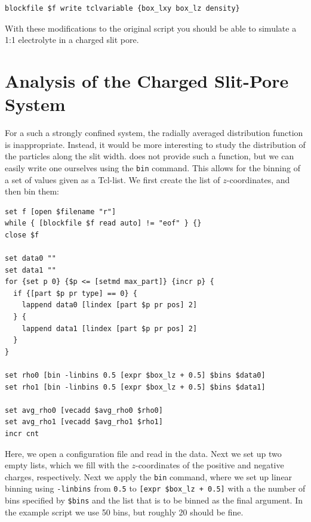 \documentclass[
a4paper,                        %
11pt,                           %
twoside,                        %
footsepline,                    %
headsepline,                    %
headexclude,                    %
footexclude,                    %
pagesize,                       %
]{scrartcl}
\begin{document}
{\small\vspace{0,2cm}
\begin{lstlisting}[numbers=none]
blockfile $f write tclvariable {box_lxy box_lz density}
\end{lstlisting}\vspace{0,2cm}
}

\noindent With these modifications to the original script you should be able to simulate a 1:1 electrolyte in a charged slit pore.

\section{Analysis of the Charged Slit-Pore System}

For a such a strongly confined system, the radially averaged distribution function is inappropriate. Instead, it would be more interesting to study the distribution of the particles along the slit width. \es{} does not provide such a function, but we can easily write one ourselves using the \verb|bin| command. This allows for the binning of a set of values given as a Tcl-list. We first create the list of $z$-coordinates, and then bin them:

{\small\vspace{0,2cm}
\begin{lstlisting}[numbers=none]
set f [open $filename "r"]
while { [blockfile $f read auto] != "eof" } {}
close $f

set data0 ""
set data1 ""
for {set p 0} {$p <= [setmd max_part]} {incr p} {
  if {[part $p pr type] == 0} {
    lappend data0 [lindex [part $p pr pos] 2]
  } {
    lappend data1 [lindex [part $p pr pos] 2]
  }
}

set rho0 [bin -linbins 0.5 [expr $box_lz + 0.5] $bins $data0]
set rho1 [bin -linbins 0.5 [expr $box_lz + 0.5] $bins $data1]

set avg_rho0 [vecadd $avg_rho0 $rho0]
set avg_rho1 [vecadd $avg_rho1 $rho1]
incr cnt
\end{lstlisting}\vspace{0,2cm}
}

\noindent Here, we open a configuration file and read in the data. Next we set up two empty lists, which we fill with the $z$-coordinates of the positive and negative charges, respectively. Next we apply the \verb|bin| command, where we set up linear binning using \verb|-linbins| from \texttt{0.5} to \texttt{[expr \$box\_lz + 0.5]} with a the number of bins specified by \texttt{\$bins} and the list that is to be binned as the final argument. In the example script we use 50 bins, but roughly 20 should be fine.
\end{document}
